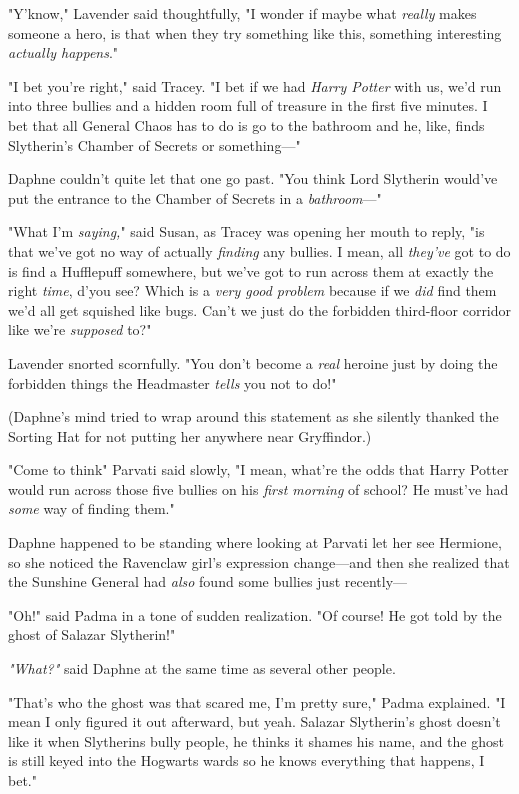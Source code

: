 "Y'know," Lavender said thoughtfully, "I wonder if maybe what \emph{really}
makes someone a hero, is that when they try something like this, something
interesting \emph{actually happens}."

"I bet you're right," said Tracey. "I bet if we had \emph{Harry Potter} with
us, we'd run into three bullies and a hidden room full of treasure in the first
five minutes. I bet that all General Chaos has to do is go to the bathroom and
he, like, finds Slytherin's Chamber of Secrets or something\mbox{---}"

Daphne couldn't quite let that one go past. "You think Lord Slytherin would've
put the entrance to the Chamber of Secrets in a \emph{bathroom}\mbox{---}"

"What I'm \emph{saying,}" said Susan, as Tracey was opening her mouth to reply,
"is that we've got no way of actually \emph{finding} any bullies. I mean, all
\emph{they've} got to do is find a Hufflepuff somewhere, but we've got to run
across them at exactly the right \emph{time}, d'you see? Which is a \emph{very
good problem} because if we \emph{did} find them we'd all get squished like
bugs. Can't we just do the forbidden third-floor corridor like we're
\emph{supposed} to?"

Lavender snorted scornfully. "You don't become a \emph{real} heroine just by
doing the forbidden things the Headmaster \emph{tells} you not to do!"

(Daphne's mind tried to wrap around this statement as she silently thanked the
Sorting Hat for not putting her anywhere near Gryffindor.)

"Come to think{\el}" Parvati said slowly, "I mean, what're the odds that
Harry Potter would run across those five bullies on his \emph{first morning} of
school? He must've had \emph{some} way of finding them."

Daphne happened to be standing where looking at Parvati let her see Hermione,
so she noticed the Ravenclaw girl's expression change---and then she realized
that the Sunshine General had \emph{also} found some bullies just recently---

"Oh!" said Padma in a tone of sudden realization. "Of course! He got told by
the ghost of Salazar Slytherin!"

\emph{"What?"} said Daphne at the same time as several other people.

"That's who the ghost was that scared me, I'm pretty sure," Padma explained. "I
mean I only figured it out afterward, but{\el} yeah. Salazar Slytherin's
ghost doesn't like it when Slytherins bully people, he thinks it shames his
name, and the ghost is still keyed into the Hogwarts wards so he knows
everything that happens, I bet."

